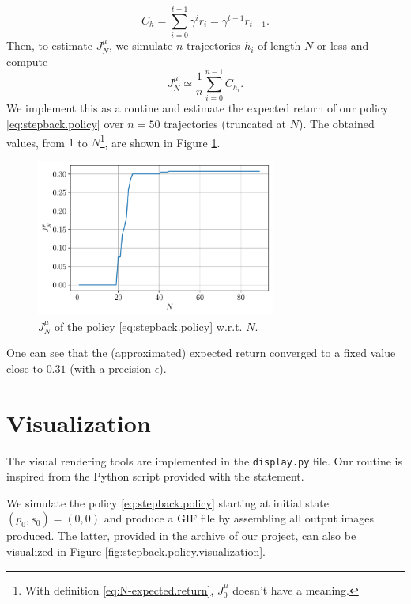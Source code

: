\documentclass[a4paper, 12pt]{article}
\begin{document}
    \begin{equation}
        C_h = \sum_{i = 0}^{t - 1} \gamma^i r_i = \gamma^{t - 1} r_{t - 1} .
    \end{equation}
    Then, to estimate $J^\mu_N$, we simulate $n$ trajectories $h_i$ of length $N$ or less and compute
    \begin{equation}
        J^\mu_N \simeq \frac{1}{n} \sum_{i = 0}^{n - 1} C_{h_i} .
    \end{equation}
    We implement this as a routine and estimate the expected return of our policy \eqref{eq:stepback.policy} over $n = 50$ trajectories (truncated at $N$). The obtained values, from $1$ to $N$\footnote{With definition \eqref{eq:N-expected.return}, $J^\mu_0$ doesn't have a meaning.}, are shown in Figure \ref{fig:expected.return.monte.carlo}.
    
    \begin{figure}[H]
        \centering
        \includegraphics[width=0.7\textwidth]{resources/pdf/2_expected_return.pdf}
        \caption{$J^\mu_N$ of the policy \eqref{eq:stepback.policy} w.r.t. $N$.}
        \label{fig:expected.return.monte.carlo}
    \end{figure}
    
    One can see that the (approximated) expected return converged to a fixed value close to $\num{0.31}$ (with  a precision $\epsilon$).
    
    \section{Visualization}
    
    The visual rendering tools are implemented in the \texttt{display.py} file. Our routine is inspired from the Python script provided with the statement.
    
    We simulate the policy \eqref{eq:stepback.policy} starting at initial state $(p_0, s_0) = (0, 0)$ and produce a GIF file by assembling all output images produced. The latter, provided in the archive of our project, can also be visualized in Figure \ref{fig:stepback.policy.visualization}.
    
\end{document}
